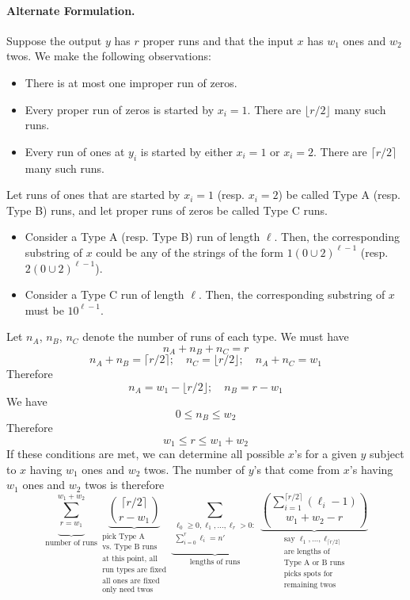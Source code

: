 \paragraph{Alternate Formulation.} Suppose the output $y$ has $r$ proper runs and that the input $x$ has $w_1$ ones and $w_2$ twos. We make the following observations:
\begin{itemize}
\item There is at most one improper run of zeros.
\item Every proper run of zeros is started by $x_i = 1$. There are $\lfloor r/2\rfloor$ many such runs.
\item Every run of ones at $y_i$ is started by either $x_i = 1$ or $x_i = 2$. There are $\lceil r/2\rceil$ many such runs.
\end{itemize}
Let runs of ones that are started by $x_i = 1$ (resp. $x_i = 2$) be called Type A (resp. Type B) runs, and let proper runs of zeros be called Type C runs. 
\begin{itemize}
\item Consider a Type A (resp. Type B) run of length $\ell$. Then, the corresponding substring of $x$ could be any of the strings of the form $1(0\cup 2)^{\ell-1}$ (resp. $2(0\cup 2)^{\ell-1}$).
\item Consider a Type C run of length $\ell$. Then, the corresponding substring of $x$ must be $10^{\ell-1}$.
\end{itemize}
Let $n_A$, $n_B$, $n_C$ denote the number of runs of each type. We must have
$$n_A + n_B + n_C = r$$
$$n_A + n_B = \lceil r/2 \rceil; \quad n_C = \lfloor r/2 \rfloor; \quad n_A + n_C = w_1$$
Therefore
$$n_A = w_1 - \lfloor r/2 \rfloor; \quad n_B = r - w_1$$
We have
$$0 \le n_B \le w_2$$
Therefore
$$w_1 \le r \le w_1 + w_2$$
If these conditions are met, we can determine all possible $x$'s for a given $y$ subject to $x$ having $w_1$ ones and $w_2$ twos. The number of $y$'s that come from $x$'s having $w_1$ ones and $w_2$ twos is therefore
$$\underbrace{\sum_{r = w_1}^{w_1 + w_2}}_{\textrm{number of runs}}\underbrace{\binom{\lceil r/2 \rceil}{r - w_1}}_{\substack{\textrm{pick Type A}\\\textrm{vs. Type B runs}\\\textrm{at this point, all}\\\textrm{run types are fixed}\\\textrm{all ones are fixed}\\\textrm{only need twos}}}\underbrace{\sum_{\substack{\ell_0 \ge 0, \ell_1, \ldots, \ell_r > 0:\\\sum_{i = 0}^r\ell_i = n'}}}_{\textrm{lengths of runs}}\underbrace{\binom{\sum_{i=1}^{\lceil r/2 \rceil}(\ell_i - 1)}{w_1 + w_2 - r}}_{\substack{\textrm{say } \ell_1, \ldots, \ell_{\lceil r/2 \rceil}\\\textrm{are lengths of}\\\textrm{Type A or B runs}\\\textrm{picks spots for}\\\textrm{remaining twos}}}$$
